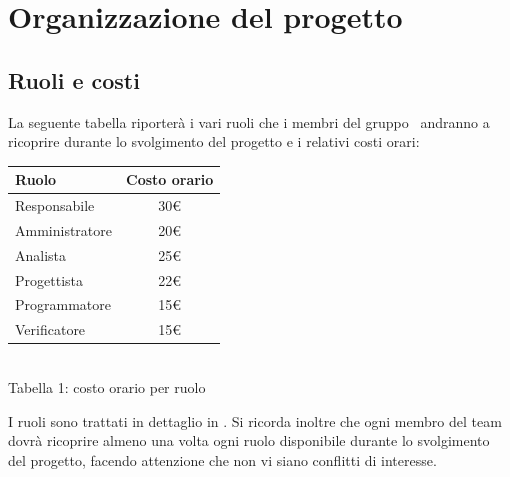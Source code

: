 \section{Organizzazione del progetto}
\subsection{Ruoli e costi}
La seguente tabella riporterà i vari ruoli che i membri del gruppo \gruppo ~andranno a ricoprire durante lo svolgimento del progetto e i relativi costi orari:
\begin{center}
\centering
\begin{tabular}{| l | c |}
\hline
Ruolo & Costo orario \\
\hline
Responsabile & 30\euro \\
Amministratore & 20\euro \\
Analista & 25\euro \\
Progettista & 22\euro \\
Programmatore & 15\euro \\
Verificatore & 15\euro \\
\hline
\end{tabular}
\\
Tabella 1: costo orario per ruolo
\end{center}
I ruoli sono trattati in dettaglio in \VerbaleB.
Si ricorda inoltre che ogni membro del team dovrà ricoprire almeno una volta ogni ruolo disponibile durante lo svolgimento del progetto, facendo attenzione che non vi siano conflitti di interesse.
